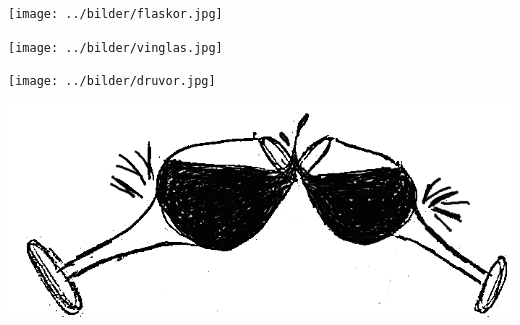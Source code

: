 %



\sclearpage

\begin{intersong}
\begin{center}
\texttt{[image: ../bilder/flaskor.jpg]} 
\end{center}
\end{intersong}
\sclearpage


\sclearpage


\begin{intersong}
\begin{center}
\texttt{[image: ../bilder/vinglas.jpg]} 
\end{center}
\end{intersong}
\sclearpage


\sclearpage


\begin{intersong}
\begin{center}
\texttt{[image: ../bilder/druvor.jpg]} 
\end{center}
\end{intersong}
\sclearpage


\begin{intersong}
	\begin{center}
		\includegraphics[width=1\textwidth]{../bilder/fardigabilder/CamillasFardigaBilder/Vinglassomskalar2.png} 
	\end{center}
\end{intersong}
\sclearpage

